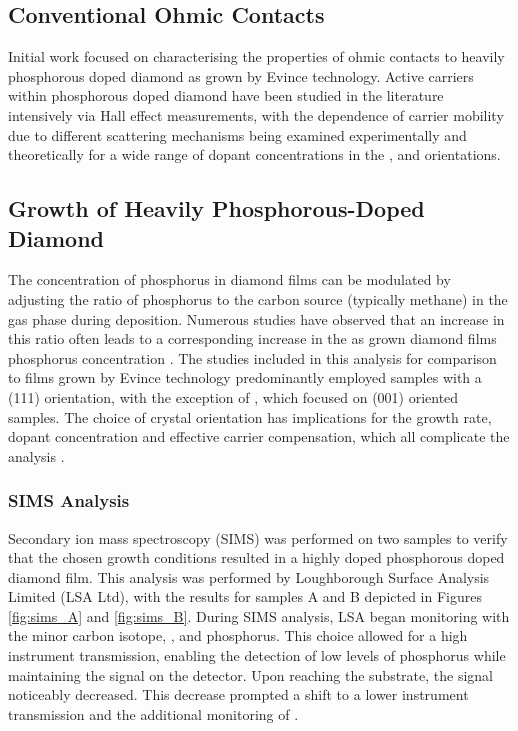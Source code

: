 \begin{refsection}
\section{Conventional Ohmic Contacts}
Initial work focused on characterising the properties of ohmic contacts to heavily phosphorous doped diamond as grown by Evince technology. Active carriers within phosphorous doped diamond have been studied in the literature intensively via Hall effect measurements, with the dependence of carrier mobility due to different scattering mechanisms being examined experimentally and theoretically for a wide range of dopant concentrations in the  \cite{stenger2013},  \cite{stenger2021} and  \cite{pinault2021} orientations.

\subsection{Growth of Heavily Phosphorous-Doped Diamond}
The concentration of phosphorus in diamond films can be modulated by adjusting the ratio of phosphorus to the carbon source (typically methane) in the gas phase during deposition. Numerous studies have observed that an increase in this ratio often leads to a corresponding increase in the as grown diamond films phosphorus concentration \cite{ohtani2014, grotjohn2014, kato2007, kato2005, kociniewski2006, temahuki2017, katamune2023, koizumi1997, kato2009}. 
The studies included in this analysis for comparison to films grown by Evince technology predominantly employed samples with a (111) orientation, with the exception of \cite{kato2007}, which focused on (001) oriented samples. The choice of crystal orientation has implications for the growth rate, dopant concentration and effective carrier compensation, which all complicate the analysis \cite{tokuda2016, mortet2022, pinault2021, stenger2021}.

\subsubsection{SIMS Analysis}
Secondary ion mass spectroscopy (SIMS) was performed on two samples to verify that the chosen growth conditions resulted in a highly doped phosphorous doped diamond film. This analysis was performed by Loughborough Surface Analysis Limited (LSA Ltd), with the results for samples A and B depicted in Figures \ref{fig:sims_A} and \ref{fig:sims_B}. During SIMS analysis, LSA began monitoring with the minor carbon isotope, , and phosphorus. This choice allowed for a high instrument transmission, enabling the detection of low levels of phosphorus while maintaining the  signal on the detector. Upon reaching the substrate, the  signal noticeably decreased. This decrease prompted a shift to a lower instrument transmission and the additional monitoring of .


\end{refsection}
